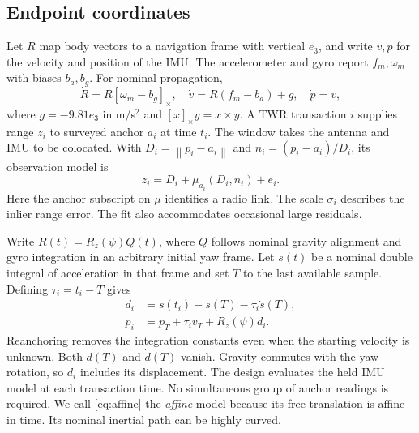 \documentclass{IEEEtaes}
\newcommand{\rz}{R_z}
\newcommand{\norm}[1]{\left\lVert#1\right\rVert}
\newcommand{\sk}[1]{[#1]_\times}
\begin{document}
\subsection{Endpoint coordinates}
Let \(R\) map body vectors to a navigation frame with vertical \(e_3\), and write \(v,p\) for the velocity and position of the IMU. The accelerometer and gyro report \(f_m,\omega_m\) with biases \(b_a,b_g\). For nominal propagation,
\begin{equation}
 \dot R=R\sk{\omega_m-b_g},\quad
 \dot v=R(f_m-b_a)+g,\quad \dot p=v ,
 \label{eq:ins}
\end{equation}
where \(g=-9.81e_3\) in m/s\(^2\) and \(\sk{x}y=x\times y\). A TWR transaction \(i\) supplies range \(z_i\) to surveyed anchor \(a_i\) at time \(t_i\). The window takes the antenna and IMU to be colocated. With \(D_i=\norm{p_i-a_i}\) and \(n_i=(p_i-a_i)/D_i\), its observation model is
\begin{equation}
 z_i=D_i+\mu_{a_i}(D_i,n_i)+e_i . \label{eq:observation}
\end{equation}
Here the anchor subscript on \(\mu\) identifies a radio link. The scale \(\sigma_i\) describes the inlier range error. The fit also accommodates occasional large residuals.

Write \(R(t)=\rz(\psi)Q(t)\), where \(Q\) follows nominal gravity alignment and gyro integration in an arbitrary initial yaw frame. Let \(s(t)\) be a nominal double integral of acceleration in that frame and set \(T\) to the last available sample. Defining \(\tau_i=t_i-T\) gives
\begin{align}
 d_i &= s(t_i)-s(T)-\tau_i\dot s(T),\nonumber\\
 p_i &= p_T+\tau_i v_T+\rz(\psi)d_i . \label{eq:affine}
\end{align}
Reanchoring removes the integration constants even when the starting velocity is unknown. Both \(d(T)\) and \(\dot d(T)\) vanish. Gravity commutes with the yaw rotation, so \(d_i\) includes its displacement. The design evaluates the held IMU model at each transaction time. No simultaneous group of anchor readings is required. We call \eqref{eq:affine} the \emph{affine} model because its free translation is affine in time. Its nominal inertial path can be highly curved.
\end{document}
